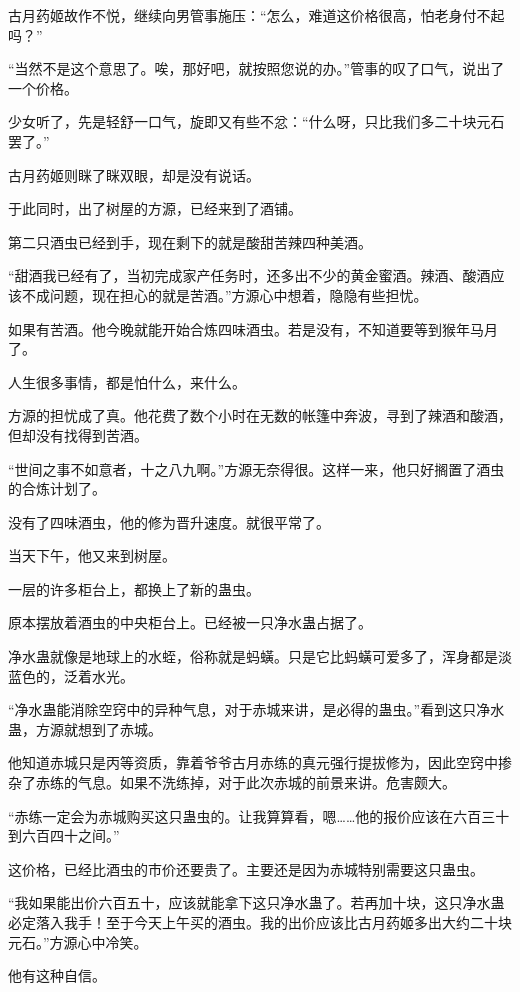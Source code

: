 \begin{this_body}
古月药姬故作不悦，继续向男管事施压：“怎么，难道这价格很高，怕老身付不起吗？”

“当然不是这个意思了。唉，那好吧，就按照您说的办。”管事的叹了口气，说出了一个价格。

少女听了，先是轻舒一口气，旋即又有些不忿：“什么呀，只比我们多二十块元石罢了。”

古月药姬则眯了眯双眼，却是没有说话。

于此同时，出了树屋的方源，已经来到了酒铺。

第二只酒虫已经到手，现在剩下的就是酸甜苦辣四种美酒。

“甜酒我已经有了，当初完成家产任务时，还多出不少的黄金蜜酒。辣酒、酸酒应该不成问题，现在担心的就是苦酒。”方源心中想着，隐隐有些担忧。

如果有苦酒。他今晚就能开始合炼四味酒虫。若是没有，不知道要等到猴年马月了。

人生很多事情，都是怕什么，来什么。

方源的担忧成了真。他花费了数个小时在无数的帐篷中奔波，寻到了辣酒和酸酒，但却没有找得到苦酒。

“世间之事不如意者，十之八九啊。”方源无奈得很。这样一来，他只好搁置了酒虫的合炼计划了。

没有了四味酒虫，他的修为晋升速度。就很平常了。

当天下午，他又来到树屋。

一层的许多柜台上，都换上了新的蛊虫。

原本摆放着酒虫的中央柜台上。已经被一只净水蛊占据了。

净水蛊就像是地球上的水蛭，俗称就是蚂蟥。只是它比蚂蟥可爱多了，浑身都是淡蓝色的，泛着水光。

“净水蛊能消除空窍中的异种气息，对于赤城来讲，是必得的蛊虫。”看到这只净水蛊，方源就想到了赤城。

他知道赤城只是丙等资质，靠着爷爷古月赤练的真元强行提拔修为，因此空窍中掺杂了赤练的气息。如果不洗练掉，对于此次赤城的前景来讲。危害颇大。

“赤练一定会为赤城购买这只蛊虫的。让我算算看，嗯……他的报价应该在六百三十到六百四十之间。”

这价格，已经比酒虫的市价还要贵了。主要还是因为赤城特别需要这只蛊虫。

“我如果能出价六百五十，应该就能拿下这只净水蛊了。若再加十块，这只净水蛊必定落入我手！至于今天上午买的酒虫。我的出价应该比古月药姬多出大约二十块元石。”方源心中冷笑。

他有这种自信。


\end{this_body}
